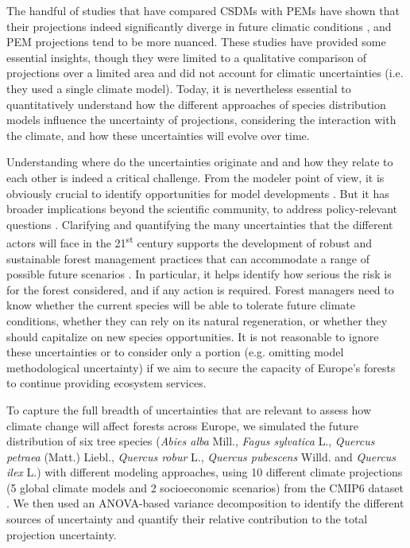 \documentclass[letterpaper,8pt]{extarticle}  %
\begin{document}
\begin{doublespacing}
\begin{linenumbers}
The handful of studies that have compared CSDMs with PEMs have shown that their projections indeed significantly diverge in future climatic conditions \citep{Morin2009, Keenan2011a, Cheaib2012, Takolander2019}, and PEM projections tend to be more nuanced. These studies have provided some essential insights, though they were limited to a qualitative comparison of projections over a limited area and did not account for climatic uncertainties (i.e. they used a single climate model). Today, it is nevertheless essential to quantitatively understand how the different approaches of species distribution models influence the uncertainty of projections, considering the interaction with the climate, and how these uncertainties will evolve over time.

Understanding where do the uncertainties originate and  and how they relate to each other is indeed a critical challenge. From the modeler point of view, it is obviously crucial to identify opportunities for model developments \citep{Petchey2015}. But it has broader implications beyond the scientific community, to address policy-relevant questions \citep{Urban2016}. Clarifying and quantifying the many uncertainties that the different actors will face in the 21\textsuperscript{st} century supports the development of robust and sustainable forest management practices that can accommodate a range of possible future scenarios \citep{IPCC2021}. In particular, it helps identify how serious the risk is for the forest considered, and if any action is required. Forest managers need to know whether the current species will be able to tolerate future climate conditions, whether they can rely on its natural regeneration, or whether they should capitalize on new species opportunities. It is not reasonable to ignore these uncertainties or to consider only a portion (e.g. omitting model methodological uncertainty) if we aim to secure the capacity of Europe’s forests to continue providing ecosystem services. 

To capture the full breadth of uncertainties that are relevant to assess how climate change will affect forests across Europe,
we simulated the future distribution of six tree species (\emph{Abies alba} Mill., \emph{Fagus sylvatica} L., \emph{Quercus petraea} (Matt.) Liebl., \emph{Quercus robur} L., \emph{Quercus pubescens} Willd. and \emph{Quercus ilex} L.) with different modeling approaches, using 10 different climate projections (5 global climate models and 2 socioeconomic scenarios) from the CMIP6 dataset \citep{Noel2022}. We then used an ANOVA-based variance decomposition to identify the different sources of uncertainty and quantify their relative contribution to the total projection uncertainty.


\end{linenumbers}
\end{doublespacing}
\end{document}
